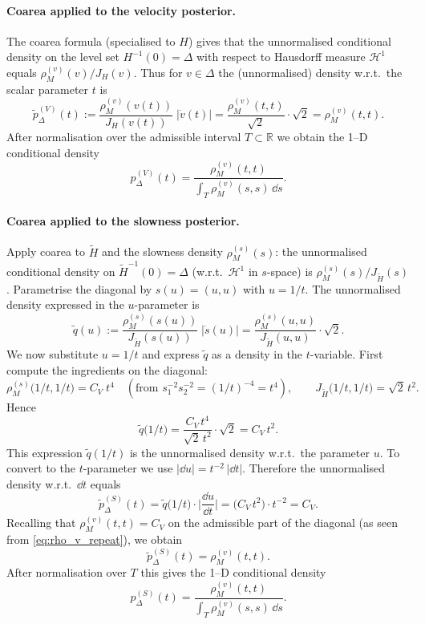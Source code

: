 \documentclass[11pt]{article}
\theoremstyle{remark}
\begin{document}
\paragraph{Coarea applied to the velocity posterior.}
The coarea formula (specialised to \(H\)) gives that the unnormalised
conditional density on the level set \(H^{-1}(0)=\Delta\) with respect to
Hausdorff measure \(\mathcal H^{1}\) equals \(\rho_M^{(v)}(v)/J_H(v)\). Thus
for \(v\in\Delta\) the (unnormalised) density w.r.t.\ the scalar parameter
\(t\) is
\[
\tilde p_\Delta^{(V)}(t)
:= \frac{\rho_M^{(v)}(v(t))}{J_H(v(t))}\;|\dot v(t)|
= \frac{\rho_M^{(v)}(t,t)}{\sqrt{2}}\cdot\sqrt{2}
= \rho_M^{(v)}(t,t).
\]
After normalisation over the admissible interval \(T\subset\mathbb{R}\) we obtain
the 1--D conditional density
\begin{equation}\label{eq:final_v}
p_\Delta^{(V)}(t)
= \frac{\rho_M^{(v)}(t,t)}{\displaystyle\int_T \rho_M^{(v)}(s,s)\,\dd s }.
\end{equation}

\paragraph{Coarea applied to the slowness posterior.}
Apply coarea to \(\tilde H\) and the slowness density \(\rho_M^{(s)}(s)\):
the unnormalised conditional density on \(\tilde H^{-1}(0)=\Delta\) (w.r.t.\
\(\mathcal H^{1}\) in \(s\)-space) is \(\rho_M^{(s)}(s)/J_{\tilde H}(s)\).
Parametrise the diagonal by \(s(u)=(u,u)\) with \(u=1/t\). The unnormalised
density expressed in the \(u\)-parameter is
\[
\tilde q(u)
:= \frac{\rho_M^{(s)}(s(u))}{J_{\tilde H}(s(u))}\;|\dot s(u)|
= \frac{\rho_M^{(s)}(u,u)}{J_{\tilde H}(u,u)}\cdot\sqrt{2}.
\]
We now substitute \(u=1/t\) and express \(\tilde q\) as a density in the
\(t\)-variable. First compute the ingredients on the diagonal:
\[
\rho_M^{(s)}\bigl(1/t,1/t\bigr)
= C_V\;t^{4}\quad(\text{from }s_1^{-2}s_2^{-2}=(1/t)^{-4}=t^4),
\qquad
J_{\tilde H}\bigl(1/t,1/t\bigr)=\sqrt{2}\,t^{2}.
\]
Hence
\[
\tilde q\bigl(1/t\bigr)
= \frac{C_V\,t^{4}}{\sqrt{2}\,t^{2}}\cdot\sqrt{2}
= C_V\,t^{2}.
\]
This expression \(\tilde q(1/t)\) is the unnormalised density w.r.t.\ the
parameter \(u\). To convert to the \(t\)-parameter we use \(|\dd u| = t^{-2}\,|\dd t|\).
Therefore the unnormalised density w.r.t.\ \(\dd t\) equals
\[
\tilde p_\Delta^{(S)}(t)
= \tilde q\bigl(1/t\bigr)\cdot\bigg|\frac{\dd u}{\dd t}\bigg|
= \bigl(C_V\,t^{2}\bigr)\cdot t^{-2}
= C_V.
\]
Recalling that \(\rho_M^{(v)}(t,t)=C_V\) on the admissible part of the diagonal
(as seen from \eqref{eq:rho_v_repeat}), we obtain
\[
\tilde p_\Delta^{(S)}(t)=\rho_M^{(v)}(t,t).
\]
After normalisation over \(T\) this gives the 1--D conditional density
\begin{equation}\label{eq:final_s}
p_\Delta^{(S)}(t)
= \frac{\rho_M^{(v)}(t,t)}{\displaystyle\int_T \rho_M^{(v)}(s,s)\,\dd s }.
\end{equation}
\end{document}
